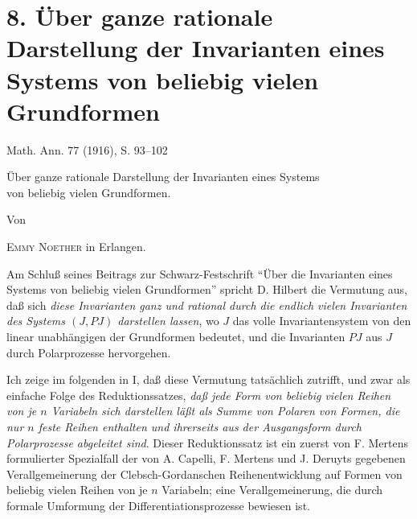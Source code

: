 \section*{8. Über ganze rationale Darstellung der Invarianten eines Systems von beliebig vielen Grundformen}
\begin{center}
Math. Ann. 77 (1916), S. 93--102
\end{center}

\begin{center}
{\Large Über ganze rationale Darstellung der Invarianten eines Systems\\
von beliebig vielen Grundformen.}\par
\vspace{1.2em}
Von\par
\vspace{0.8em}
{\scshape Emmy Noether} in Erlangen.
\end{center}

Am Schluß seines Beitrags zur Schwarz-Festschrift ``Über die Invarianten eines Systems von beliebig vielen Grundformen'' spricht D. Hilbert die Vermutung aus, daß sich \emph{diese Invarianten ganz und rational durch die endlich vielen Invarianten des Systems $(J,PJ)$ darstellen lassen}, wo $J$ das volle Invariantensystem von den linear unabhängigen der Grundformen bedeutet, und die Invarianten $PJ$ aus $J$ durch Polarprozesse hervorgehen.

Ich zeige im folgenden in I, daß diese Vermutung tatsächlich zutrifft, und zwar als einfache Folge des Reduktionssatzes, \emph{daß jede Form von beliebig vielen Reihen von je $n$ Variabeln sich darstellen läßt als Summe von Polaren von Formen, die nur $n$ feste Reihen enthalten und ihrerseits aus der Ausgangsform durch Polarprozesse abgeleitet sind}. Dieser Reduktionssatz ist ein zuerst von F. Mertens formulierter Spezialfall der von A. Capelli, F. Mertens und J. Deruyts gegebenen Verallgemeinerung der Clebsch-Gordanschen Reihenentwicklung auf Formen von beliebig vielen Reihen von je $n$ Variabeln; eine Verallgemeinerung, die durch formale Umformung der Differentiationsprozesse bewiesen ist.

